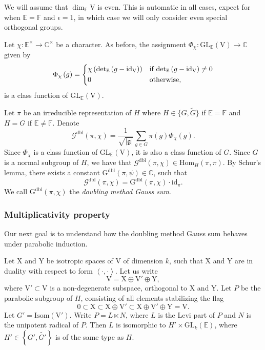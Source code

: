\documentclass[12pt, reqno]{amsart}
\theoremstyle{definition}
\theoremstyle{definition}
\theoremstyle{definition}
\newcommand{\cComplex}{\mathbb{C}}
\newcommand{\multiplicativegroup}[1]{#1^{\times}}
\newcommand{\detQuadratic}{{\det}_{\quadraticExtension}}
\newcommand{\Hom}{\mathrm{Hom}}
\newcommand{\idmap}{\mathrm{id}}
\newcommand{\sizeof}[1]{\left|#1\right|}
\newcommand{\hermitianSpace}{\mathrm{V}}
\newcommand{\xIsotropic}{\mathrm{X}}
\newcommand{\yIsotropic}{\mathrm{Y}}
\newcommand{\innerproduct}[2]{\left\langle #1,#2\right\rangle}
\newcommand{\fieldCharacter}{\psi}
\newcommand{\GL}{\mathrm{GL}}
\newcommand{\GroupExtension}[1]{\widetilde{#1}}
\newcommand{\finiteField}{\mathbb{F}}
\newcommand{\quadraticExtension}{\mathbb{E}}
\newcommand{\dblGaussSum}[2]{\mathcal{G}^{\mathrm{dbl}}\left(#1, #2\right)}
\newcommand{\dblGaussSumScalar}[2]{\mathrm{G}^{\mathrm{dbl}}\left(#1, #2\right)}
\newcommand{\IsometryGroup}{\mathrm{Isom}}
\newcommand{\lieAlgebra}{\mathfrak{g}}
\begin{document}
We will assume that $\dim_{\finiteField} \hermitianSpace$ is even. This is automatic in all cases, expect for when $\quadraticExtension = \finiteField$ and $\epsilon = 1$, in which case we will only consider even special orthogonal groups.

Let $\chi \colon \multiplicativegroup{\quadraticExtension} \to \multiplicativegroup{\cComplex}$ be a character. As before, the assignment $\Phi_{\chi} \colon \GL_{\quadraticExtension}\left(\hermitianSpace\right) \to \cComplex$ given by $$\Phi_{\chi}\left(g\right) = \begin{dcases}
\chi\left(\detQuadratic\left(g - \idmap_{\hermitianSpace}\right)\right) & \text{if }\detQuadratic\left(g - \idmap_{\hermitianSpace}\right) \ne 0\\
0 & \text{otherwise,}
\end{dcases}$$
is a class function of $\GL_{\quadraticExtension}\left(\hermitianSpace\right)$.

Let $\pi$ be an irreducible representation of $H$ where $H \in \{G, \GroupExtension{G}\}$ if $\quadraticExtension = \finiteField$ and $H = G$ if $\quadraticExtension \ne \finiteField$. Denote $$\dblGaussSum{\pi}{\chi} = \frac{1}{\sqrt{\sizeof{\lieAlgebra}}} \sum_{g \in G} \pi\left(g\right) \Phi_{\chi}\left(g\right).$$
Since $\Phi_{\chi}$ is a class function of $\GL_{\quadraticExtension}\left(\hermitianSpace\right)$, it is also a class function of $G$. Since $G$ is a normal subgroup of $H$, we have that $\dblGaussSum{\pi}{\chi} \in \Hom_{H}\left(\pi, \pi\right)$. By Schur's lemma, there exists a constant $\dblGaussSumScalar{\pi}{\fieldCharacter} \in \cComplex$, such that $$\dblGaussSum{\pi}{\chi} = \dblGaussSumScalar{\pi}{\chi} \cdot \idmap_\pi.$$
We call $\dblGaussSumScalar{\pi}{\chi}$ the \emph{doubling method Gauss sum}.

\subsubsection{Multiplicativity property}
Our next goal is to understand how the doubling method Gauss sum behaves under parabolic induction.

Let $\xIsotropic$ and $\yIsotropic$ be isotropic spaces of $\hermitianSpace$ of dimension $k$, such that $\xIsotropic$ and $\yIsotropic$ are in duality with respect to form $\innerproduct{\cdot}{\cdot}$. Let us write $$\hermitianSpace = \xIsotropic \oplus \hermitianSpace' \oplus \yIsotropic,$$
where $\hermitianSpace' \subset \hermitianSpace$ is a non-degenerate subspace, orthogonal to $\xIsotropic$ and $\yIsotropic$. Let $P$ be the parabolic subgroup of $H$, consisting of all elements stabilizing the flag $$0 \subset \xIsotropic \subset \xIsotropic \oplus \hermitianSpace' \subset \xIsotropic \oplus \hermitianSpace' \oplus \yIsotropic = \hermitianSpace.$$
Let $G' = \IsometryGroup\left(\hermitianSpace'\right)$. Write $P = L \ltimes N$, where $L$ is the Levi part of $P$ and $N$ is the unipotent radical of $P$. Then $L$ is isomorphic to $H' \times \GL_k\left(\quadraticExtension\right)$, where $H' \in \left\{G',\GroupExtension{G'}\right\}$ is of the same type as $H$. 
\end{document}

